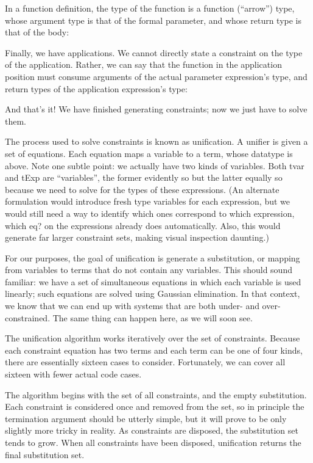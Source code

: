 In a function definition, the type of the function is a function (“arrow”) type,
whose argument type is that of the formal parameter, and whose return type is
that of the body:

Finally, we have applications. We cannot directly state a constraint on the type
of the application. Rather, we can say that the function in the application
position must consume arguments of the actual parameter expression’s type, and
return types of the application expression’s type:

And that’s it! We have finished generating constraints; now we just have to
solve them.


The process used to solve constraints is known as unification. A unifier is
given a set of equations. Each equation maps a variable to a term, whose
datatype is above. Note one subtle point: we actually have two kinds of
variables. Both tvar and tExp are “variables”, the former evidently so but the
latter equally so because we need to solve for the types of these expressions.
(An alternate formulation would introduce fresh type variables for each
expression, but we would still need a way to identify which ones correspond to
which expression, which eq? on the expressions already does automatically. Also,
this would generate far larger constraint sets, making visual inspection
daunting.)

For our purposes, the goal of unification is generate a substitution, or mapping
from variables to terms that do not contain any variables. This should sound
familiar: we have a set of simultaneous equations in which each variable is used
linearly; such equations are solved using Gaussian elimination. In that context,
we know that we can end up with systems that are both under- and
over-constrained. The same thing can happen here, as we will soon see.

The unification algorithm works iteratively over the set of constraints. Because
each constraint equation has two terms and each term can be one of four kinds,
there are essentially sixteen cases to consider. Fortunately, we can cover all
sixteen with fewer actual code cases.

The algorithm begins with the set of all constraints, and the empty
substitution. Each constraint is considered once and removed from the set, so in
principle the termination argument should be utterly simple, but it will prove
to be only slightly more tricky in reality. As constraints are disposed, the
substitution set tends to grow. When all constraints have been disposed,
unification returns the final substitution set.


